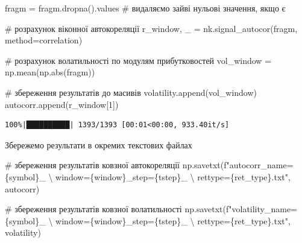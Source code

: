 \documentclass[
  letterpaper,
]{report}
\newenvironment{Shaded}{\begin{snugshade}}{\end{snugshade}}
\newcommand{\BuiltInTok}[1]{\textcolor[rgb]{0.00,0.23,0.31}{#1}}
\newcommand{\CharTok}[1]{\textcolor[rgb]{0.13,0.47,0.30}{#1}}
\newcommand{\CommentTok}[1]{\textcolor[rgb]{0.37,0.37,0.37}{#1}}
\newcommand{\DecValTok}[1]{\textcolor[rgb]{0.68,0.00,0.00}{#1}}
\newcommand{\NormalTok}[1]{\textcolor[rgb]{0.00,0.23,0.31}{#1}}
\newcommand{\OperatorTok}[1]{\textcolor[rgb]{0.37,0.37,0.37}{#1}}
\newcommand{\SpecialCharTok}[1]{\textcolor[rgb]{0.37,0.37,0.37}{#1}}
\newcommand{\SpecialStringTok}[1]{\textcolor[rgb]{0.13,0.47,0.30}{#1}}
\newcommand{\StringTok}[1]{\textcolor[rgb]{0.13,0.47,0.30}{#1}}
\begin{document}
\begin{Shaded}
\begin{Highlighting}[]
\NormalTok{    fragm }\OperatorTok{=}\NormalTok{ fragm.dropna().values         }\CommentTok{\# видаляємо зайві нульові значення, якщо є}
    
    \CommentTok{\# розрахунок віконної автокореляції}
\NormalTok{    r\_window, \_ }\OperatorTok{=}\NormalTok{ nk.signal\_autocor(fragm, method}\OperatorTok{=}\StringTok{\textquotesingle{}correlation\textquotesingle{}}\NormalTok{) }

    \CommentTok{\# розрахунок волатильності по модулям прибутковостей                                     }
\NormalTok{    vol\_window }\OperatorTok{=}\NormalTok{ np.mean(np.}\BuiltInTok{abs}\NormalTok{(fragm))}

    \CommentTok{\# збереження результатів до масивів}
\NormalTok{    volatility.append(vol\_window)}
\NormalTok{    autocorr.append(r\_window[}\DecValTok{1}\NormalTok{])}
\end{Highlighting}
\end{Shaded}

\begin{verbatim}
100%|██████████| 1393/1393 [00:01<00:00, 933.40it/s]
\end{verbatim}

Збережемо результати в окремих текстових файлах

\begin{Shaded}
\begin{Highlighting}[]
\CommentTok{\# збереження результатів ковзної автокореляції}
\NormalTok{np.savetxt(}\SpecialStringTok{f"autocorr\_name=}\SpecialCharTok{\{}\NormalTok{symbol}\SpecialCharTok{\}}\SpecialStringTok{\_ }\CharTok{\textbackslash{}}
\SpecialStringTok{            window=}\SpecialCharTok{\{}\NormalTok{window}\SpecialCharTok{\}}\SpecialStringTok{\_step=}\SpecialCharTok{\{}\NormalTok{tstep}\SpecialCharTok{\}}\SpecialStringTok{\_ }\CharTok{\textbackslash{}}
\SpecialStringTok{            rettype=}\SpecialCharTok{\{}\NormalTok{ret\_type}\SpecialCharTok{\}}\SpecialStringTok{.txt"}\NormalTok{, autocorr)}

\CommentTok{\# збереження результатів ковзної волатильності}
\NormalTok{np.savetxt(}\SpecialStringTok{f"volatility\_name=}\SpecialCharTok{\{}\NormalTok{symbol}\SpecialCharTok{\}}\SpecialStringTok{\_ }\CharTok{\textbackslash{}}
\SpecialStringTok{            window=}\SpecialCharTok{\{}\NormalTok{window}\SpecialCharTok{\}}\SpecialStringTok{\_step=}\SpecialCharTok{\{}\NormalTok{tstep}\SpecialCharTok{\}}\SpecialStringTok{\_ }\CharTok{\textbackslash{}}
\SpecialStringTok{            rettype=}\SpecialCharTok{\{}\NormalTok{ret\_type}\SpecialCharTok{\}}\SpecialStringTok{.txt"}\NormalTok{, volatility)}
\end{Highlighting}
\end{Shaded}
\end{document}
